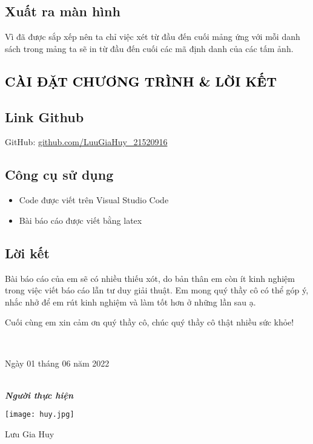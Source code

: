 \documentclass [14pt, a4paper]{report}
\begin{document}
\section{Xuất ra màn hình}
\setlength{\parindent}{1cm}
Vì đã được sắp xếp nên ta chỉ việc xét từ đầu đến cuối mảng ứng với mỗi danh sách trong mảng ta sẽ in từ đầu đến cuối các mã định danh của các tấm ảnh.

\textcolor{black}{
\chapter{CÀI ĐẶT CHƯƠNG TRÌNH \& LỜI KẾT} }
\section{Link Github}

GitHub:
\href{https://github.com/UIT-21520916/Do-an-cuoi-ki.git}{\fontsize{14}{}\selectfont  
     github.com/LuuGiaHuy\_21520916}
\section{Công cụ sử dụng }
\begin{itemize}
\fontsize{13}{18}\selectfont
  \item Code được viết trên Visual Studio Code
  \item Bài báo cáo được viết bằng latex
    
\end{itemize}
\section{Lời kết}
\setlength{\parindent}{1cm}
Bài báo cáo của em sẽ có nhiều thiếu xót, do bản thân em còn ít kinh nghiệm trong việc viết báo cáo lẫn tư duy giải thuật. Em mong quý thầy cô có thể góp ý,  nhắc nhở để em rút kinh nghiệm và làm tốt hơn ở những lần sau ạ.


Cuối cùng em xin cảm ơn quý thầy cô, chúc quý thầy cô thật nhiều sức khỏe!

\setlength{\parindent}{0cm}
\hfill \\
\begin{flushright}
Ngày 01 tháng 06 năm 2022 
\end{flushright}
\begin{flushright}
 \hfill \\
\textbf{\textit{Người thực hiện }}

\graphicspath{ {images/} }
 \texttt{[image: huy.jpg]}

 Lưu Gia Huy \hspace{3.5cm}
\end{flushright}
\end{document}
